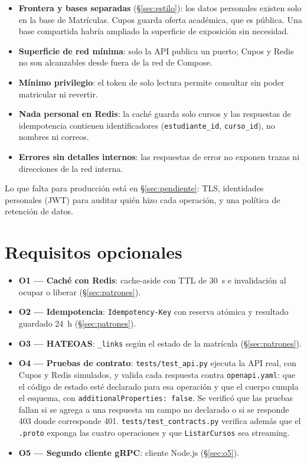 \documentclass[11pt,spanish]{article}
\begin{document}
\begin{itemize}
    \item \textbf{Frontera y bases separadas} (\S\ref{sec:estilo}): los datos personales existen solo en la base de Matrículas. Cupos guarda oferta académica, que es pública. Una base compartida habría ampliado la superficie de exposición sin necesidad.
    \item \textbf{Superficie de red mínima}: solo la API publica un puerto; Cupos y Redis no son alcanzables desde fuera de la red de Compose.
    \item \textbf{Mínimo privilegio}: el token de solo lectura permite consultar sin poder matricular ni revertir.
    \item \textbf{Nada personal en Redis}: la caché guarda solo cursos y las respuestas de idempotencia contienen identificadores (\texttt{estudiante\_id}, \texttt{curso\_id}), no nombres ni correos.
    \item \textbf{Errores sin detalles internos}: las respuestas de error no exponen trazas ni direcciones de la red interna.
\end{itemize}

Lo que falta para producción está en \S\ref{sec:pendiente}: TLS, identidades personales (JWT) para auditar quién hizo cada operación, y una política de retención de datos.

\section{Requisitos opcionales}

\begin{itemize}
    \item \textbf{O1 — Caché con Redis}: cache-aside con TTL de 30~s e invalidación al ocupar o liberar (\S\ref{sec:patrones}).
    \item \textbf{O2 — Idempotencia}: \texttt{Idempotency-Key} con reserva atómica y resultado guardado 24~h (\S\ref{sec:patrones}).
    \item \textbf{O3 — HATEOAS}: \texttt{\_links} según el estado de la matrícula (\S\ref{sec:patrones}).
    \item \textbf{O4 — Pruebas de contrato}: \texttt{tests/test\_api.py} ejecuta la API real, con Cupos y Redis simulados, y valida cada respuesta contra \texttt{openapi.yaml}: que el código de estado esté declarado para esa operación y que el cuerpo cumpla el esquema, con \texttt{additionalProperties: false}. Se verificó que las pruebas fallan si se agrega a una respuesta un campo no declarado o si se responde 403 donde corresponde 401. \texttt{tests/test\_contracts.py} verifica además que el \texttt{.proto} exponga las cuatro operaciones y que \texttt{ListarCursos} sea streaming.
    \item \textbf{O5 — Segundo cliente gRPC}: cliente Node.js (\S\ref{sec:o5}).
\end{itemize}
\end{document}
